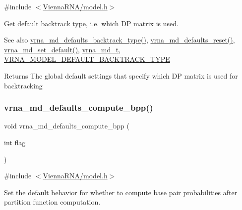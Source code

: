 {\ttfamily \#include $<$\mbox{\hyperlink{model_8h}{Vienna\+R\+N\+A/model.\+h}}$>$}



Get default backtrack type, i.\+e. which DP matrix is used. 

\begin{DoxySeeAlso}{See also}
\mbox{\hyperlink{group__model__details_ga68305274de96b56b7799575e222560d8}{vrna\+\_\+md\+\_\+defaults\+\_\+backtrack\+\_\+type()}}, \mbox{\hyperlink{group__model__details_ga70834424cf804d149937de89f80ceb45}{vrna\+\_\+md\+\_\+defaults\+\_\+reset()}}, \mbox{\hyperlink{group__model__details_ga8ac6ff84936282436f822644bf841f66}{vrna\+\_\+md\+\_\+set\+\_\+default()}}, \mbox{\hyperlink{group__model__details_ga1f8a10e12a0a1915f2a4eff0b28ea17c}{vrna\+\_\+md\+\_\+t}}, \mbox{\hyperlink{group__model__details_gad0e81fcaca53c4a826c68e0796de2afb}{V\+R\+N\+A\+\_\+\+M\+O\+D\+E\+L\+\_\+\+D\+E\+F\+A\+U\+L\+T\+\_\+\+B\+A\+C\+K\+T\+R\+A\+C\+K\+\_\+\+T\+Y\+PE}} 
\end{DoxySeeAlso}
\begin{DoxyReturn}{Returns}
The global default settings that specify which DP matrix is used for backtracking 
\end{DoxyReturn}
\mbox{\label{group__model__details_gaf1b5db10f1f476767f9a95f8a78e3132}} 
\subsubsection{\texorpdfstring{vrna\_md\_defaults\_compute\_bpp()}{vrna\_md\_defaults\_compute\_bpp()}}
{\footnotesize\ttfamily void vrna\+\_\+md\+\_\+defaults\+\_\+compute\+\_\+bpp (\begin{DoxyParamCaption}\item[{int}]{flag }\end{DoxyParamCaption})}



{\ttfamily \#include $<$\mbox{\hyperlink{model_8h}{Vienna\+R\+N\+A/model.\+h}}$>$}



Set the default behavior for whether to compute base pair probabilities after partition function computation. 

